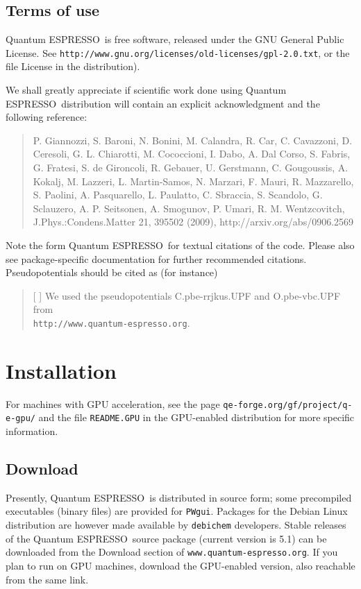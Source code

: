\documentclass[12pt,a4paper]{article}
\def\version{5.1}
\def\qe{{\sc Quantum ESPRESSO}}
\begin{document}
\subsection{Terms of use}
\label{SubSec:Terms}

\qe\ is free software, released under the 
GNU General Public License. See
\texttt{http://www.gnu.org/licenses/old-licenses/gpl-2.0.txt}, 
or the file License in the distribution).
    
We shall greatly appreciate if scientific work done using \qe\ distribution will 
contain an explicit acknowledgment and the following reference:
\begin{quote}
P. Giannozzi, S. Baroni, N. Bonini, M. Calandra, R. Car, C. Cavazzoni,
D. Ceresoli, G. L. Chiarotti, M. Cococcioni, I. Dabo, A. Dal Corso,
S. Fabris, G. Fratesi, S. de Gironcoli, R. Gebauer, U. Gerstmann,
C. Gougoussis, A. Kokalj, M. Lazzeri, L. Martin-Samos, N. Marzari,
F. Mauri, R. Mazzarello, S. Paolini, A. Pasquarello, L. Paulatto,
C. Sbraccia, S. Scandolo, G. Sclauzero, A. P. Seitsonen, A. Smogunov,
P. Umari, R. M. Wentzcovitch, J.Phys.:Condens.Matter 21, 395502 (2009),
http://arxiv.org/abs/0906.2569
\end{quote}
Note the form \qe\ for textual citations of the code.
Please also see package-specific documentation for
further recommended citations.
Pseudopotentials should be cited as (for instance)
\begin{quote}
[ ] We used the pseudopotentials C.pbe-rrjkus.UPF
and O.pbe-vbc.UPF from\\
\texttt{http://www.quantum-espresso.org}.
\end{quote}
\section{Installation}

For machines with GPU acceleration, see the page
\texttt{qe-forge.org/gf/project/q-e-gpu/} and the
file \texttt{README.GPU} in the GPU-enabled distribution
for more specific information.

\subsection{Download}
\label{SubSec:Download}
 
Presently, \qe\ is distributed in source form; some precompiled 
executables (binary files) are provided for \texttt{PWgui}.
Packages for the Debian Linux distribution are however 
made available by \texttt{debichem} developers.
Stable releases of the \qe\ source package (current version 
is \version) can be downloaded from the Download section
of \texttt{www.quantum-espresso.org}. If you plan to run
on GPU machines, download the GPU-enabled version, also reachable 
from the same link. 
\end{document}
